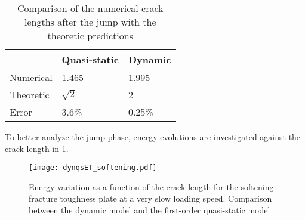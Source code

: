 \begin{table}[htbp]
\centering
\caption{Comparison of the numerical crack lengths after the jump with the theoretic predictions} \label{tab:compljump}
\begin{tabular}{lll} \toprule
& Quasi-static & Dynamic \\ \midrule
Numerical & 1.465 & 1.995 \\
Theoretic & $\sqrt{2}$ & 2 \\
Error & 3.6\% & 0.25\% \\ \bottomrule
\end{tabular}
\end{table}

To better analyze the jump phase, energy evolutions are investigated against the crack length in \cref{fig:evoRNJjump}.
\begin{figure}[htbp]
\centering
\texttt{[image: dynqsET\_softening.pdf]}
\caption{Energy variation as a function of the crack length for the softening fracture toughness plate at a very slow loading speed. Comparison between the dynamic model and the first-order quasi-static model} \label{fig:evoRNJjump}
\end{figure}
